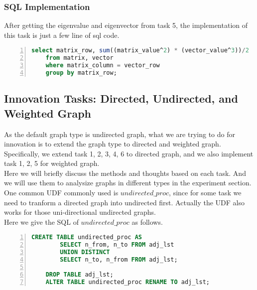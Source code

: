 \subsubsection{SQL Implementation}
After getting the eigenvalue and eigenvector from task 5, the implementation of this task is just a few line of sql code.
\begin{lstlisting}[caption=Count of Triangle, label=tr, language=SQL, numbers=left, numberstyle=\tiny, breaklines, tabsize=2, frame=single, keepspaces=false]
	select matrix_row, sum((matrix_value^2) * (vector_value^3))/2
	from matrix, vector
	where matrix_column = vector_row
	group by matrix_row;
\end{lstlisting}

\subsection{Innovation Tasks: Directed, Undirected, and Weighted Graph}
As the default graph type is undirected graph, what we are trying to do for innovation is to extend the graph type to directed and weighted graph.\\
Specifically, we extend task 1, 2, 3, 4, 6 to directed graph, and we also implement task 1, 2, 5 for weighted graph.\\
Here we will briefly discuss the methods and thoughts based on each task. And we will use them to analysize graphs in different types in the experiment section.\\
One common UDF commonly used is $undirected\_proc$, since for some task we need to tranform a directed graph into undirected first. Actually the UDF also works for those uni-directional undirected graphs. \\
Here we give the SQL of $undirected\_proc$ as follows.
\begin{lstlisting}[caption=Undirected Procedure, label=up, language=SQL, numbers=left, numberstyle=\tiny, breaklines, tabsize=2, frame=single, keepspaces=false]
	CREATE TABLE undirected_proc AS 
		SELECT n_from, n_to FROM adj_lst 
		UNION DISTINCT 
		SELECT n_to, n_from FROM adj_lst;

	DROP TABLE adj_lst;
	ALTER TABLE undirected_proc RENAME TO adj_lst;
\end{lstlisting}

